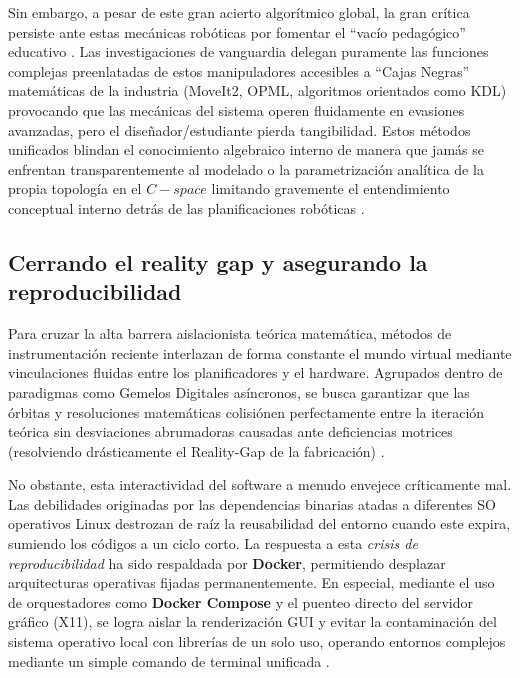 Sin embargo, a pesar de este gran acierto algorítmico global, la gran crítica persiste 
ante estas mecánicas robóticas por fomentar el \enquote{vacío pedagógico} 
educativo \parencite{de2025development}. Las investigaciones de vanguardia 
delegan puramente las funciones complejas preenlatadas de estos manipuladores 
accesibles a \enquote{Cajas Negras} matemáticas de la industria (MoveIt2, OPML, 
algoritmos orientados como KDL) provocando que las mecánicas del sistema operen 
fluidamente en evasiones avanzadas, pero el diseñador/estudiante pierda tangibilidad. 
Estos métodos unificados blindan el conocimiento algebraico interno de manera que 
jamás se enfrentan transparentemente al modelado o la parametrización analítica de 
la propia topología en el $C-space$ limitando gravemente el entendimiento conceptual 
interno detrás de las planificaciones robóticas  
\parencite{semwal2024manipulator, vega2025g}.

\subsection{Cerrando el reality gap y asegurando la reproducibilidad}
Para cruzar la alta barrera aislacionista teórica matemática, métodos de 
instrumentación reciente interlazan de forma constante el mundo virtual mediante 
vinculaciones fluidas entre los planificadores y el hardware. Agrupados dentro de 
paradigmas como Gemelos Digitales asíncronos, se busca garantizar que las órbitas y 
resoluciones matemáticas colisiónen perfectamente entre la iteración teórica sin 
desviaciones abrumadoras causadas ante deficiencias motrices (resolviendo drásticamente 
el Reality-Gap de la fabricación) \parencite{de2025development}. 

No obstante, esta interactividad del software a menudo envejece críticamente mal. Las 
debilidades originadas por las dependencias binarias atadas a diferentes SO operativos 
Linux destrozan de raíz la reusabilidad del entorno cuando este expira, sumiendo los 
códigos a un ciclo corto. La respuesta a esta \textit{crisis de reproducibilidad} ha 
sido respaldada por \textbf{Docker}, permitiendo desplazar arquitecturas operativas 
fijadas permanentemente. En especial, mediante el uso de orquestadores como 
\textbf{Docker Compose} y el puenteo directo del servidor gráfico (X11), se logra 
aislar la renderización GUI y evitar la contaminación del sistema operativo local 
con librerías de un solo uso, operando entornos complejos mediante un simple comando 
de terminal unificada \parencite{martinez2022docker, cervera2023run}.

